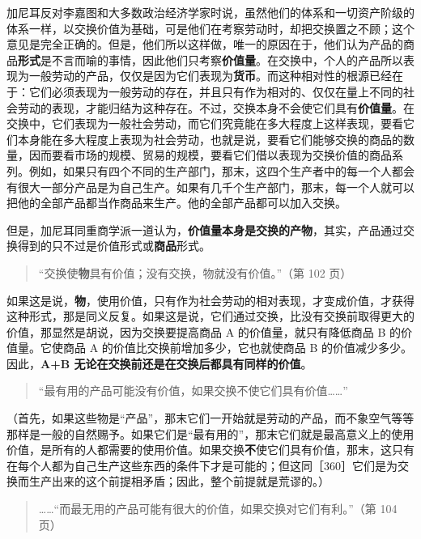 加尼耳反对李嘉图和大多数政治经济学家时说，虽然他们的体系和一切资产阶级的体系一样，以交换价值为基础，可是他们在考察劳动时，却把交换置之不顾；这个意见是完全正确的。但是，他们所以这样做，唯一的原因在于，他们认为产品的商品\textbf{形式}是不言而喻的事情，因此他们只考察\textbf{价值量}。在交换中，个人的产品所以表现为一般劳动的产品，仅仅是因为它们表现为\textbf{货币}。而这种相对性的根源已经在于：它们必须表现为一般劳动的存在，并且只有作为相对的、仅仅在量上不同的社会劳动的表现，才能归结为这种存在。不过，交换本身不会使它们具有\textbf{价值量}。在交换中，它们表现为一般社会劳动，而它们究竟能在多大程度上这样表现，要看它们本身能在多大程度上表现为社会劳动，也就是说，要看它们能够交换的商品的数量，因而要看市场的规模、贸易的规模，要看它们借以表现为交换价值的商品系列。例如，如果只有四个不同的生产部门，那末，这四个生产者中的每一个人都会有很大一部分产品是为自己生产。如果有几千个生产部门，那末，每一个人就可以把他的全部产品都当作商品来生产。他的全部产品都可以加入交换。

但是，加尼耳同重商学派一道认为，\textbf{价值量本身是交换的产物}，其实，产品通过交换得到的只不过是价值形式或\textbf{商品}形式。

\begin{quote}“交换使\textbf{物}具有价值；没有交换，物就没有价值。”（第 102 页）\end{quote}

如果这是说，\textbf{物}，使用价值，只有作为社会劳动的相对表现，才变成价值，才获得这种形式，那是同义反复。如果这是说，它们通过交换，比没有交换前取得更大的价值，那显然是胡说，因为交换要提高商品 A 的价值量，就只有降低商品 B 的价值量。它使商品 A 的价值比交换前增加多少，它也就使商品 B 的价值减少多少。因此，\textbf{A+B 无论在交换前还是在交换后都具有同样的价值}。

\begin{quote}“最有用的产品可能没有价值，如果交换不使它们具有价值……”\end{quote}

（首先，如果这些物是“产品”，那末它们一开始就是劳动的产品，而不象空气等等那样是一般的自然赐予。如果它们是“最有用的”，那末它们就是最高意义上的使用价值，是所有的人都需要的使用价值。如果交换\textbf{不}使它们具有价值，那末，这只有在每个人都为自己生产这些东西的条件下才是可能的；但这同［360］它们是为交换而生产出来的这个前提相矛盾；因此，整个前提就是荒谬的。）

\begin{quote}……“而最无用的产品可能有很大的价值，如果交换对它们有利。”（第 104 页）\end{quote}

